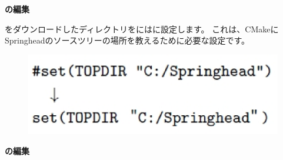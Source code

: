 \bigskip
\noindent
\bf{\CMakeTopdir{}}\KLUDGE の編集
\begin{narrow}[20pt]
	\SprLib \KLUDGE をダウンロードしたディレクトリを\CMakeTopdir{}\KLUDGE には\SprLib \KLUDGE に設定します。
	\KLUDGE これは、CMake\KLUDGE にSpringhead\KLUDGE のソースツリーの場所を教えるために必要な設定です。

\ifLwarp
	\begin{figure}[h]
	    \begin{center}
	    \includegraphics[width=\textwidth]{fig/command-3-1-b.eps}
	    \end{center}
	    \label{fig:DownloadTree}
	\end{figure}
\else
	\begin{narrow}[15pt]
	\end{narrow}
\fi
\end{narrow}
\medskip
\noindent
\bf{\CMakeLists{}}\KLUDGE の編集
